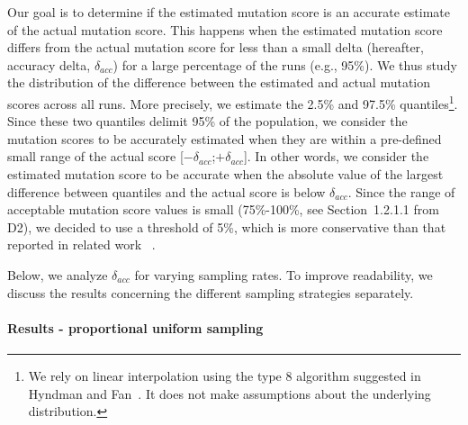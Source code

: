%

%
Our goal is to determine if the estimated mutation score is an accurate estimate of the actual mutation score.
This happens when the estimated mutation score differs from the actual mutation score for less than a small delta (hereafter, accuracy delta, $\delta_{acc}$) for a large percentage of the runs (e.g., 95\%).
We thus study the distribution of the difference between the estimated and actual mutation scores across all runs. More precisely, we estimate the 2.5\% and 97.5\% quantiles\footnote{We rely on linear interpolation using the type 8 
algorithm suggested in Hyndman and Fan~\cite{Hyndman1996}. It does not make assumptions about the underlying distribution.}.
Since these two quantiles delimit 95\% of the population,
we consider the mutation scores to be accurately estimated when they are within a pre-defined small range of the actual score [$-\delta_{acc}$;$+\delta_{acc}$].
In other words, we consider the estimated mutation score to be accurate when 
the absolute value of the largest difference between quantiles and the actual score is below $\delta_{acc}$.
Since the range of acceptable mutation score values is small (75\%-100\%, see Section~1.2.1.1 from D2), we decided to use a threshold of 5\%, which is more conservative than that reported in related work ~\cite{gopinath2015hard}. 

Below, we analyze $\delta_{acc}$ for varying sampling rates. To improve readability, we discuss the results concerning the different sampling strategies separately.




\paragraph{Results - proportional uniform sampling}

